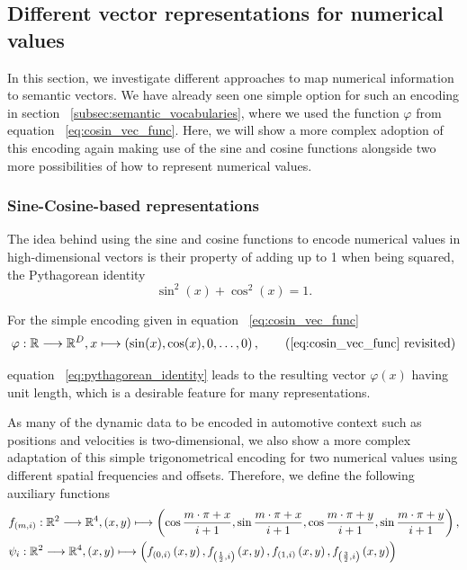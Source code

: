 \subsection{Different vector representations for numerical values}%
\label{subsec:different_vector_representations_for_numerical_values}

In this section, we investigate different approaches to map numerical information to semantic vectors.
We have already seen one simple option for such an encoding in section ~\ref{subsec:semantic_vocabularies}, where we used the function $\varphi$ from equation ~\ref{eq:cosin_vec_func}.
Here, we will show a more complex adoption of this encoding again making use of the sine and cosine functions alongside two more possibilities of how to represent numerical values.

\subsubsection{Sine-Cosine-based representations}%
\label{ssubsec:sine_cosine_based_representations}

The idea behind using the sine and cosine functions to encode numerical values in high-dimensional vectors is their property of adding up to \num{1} when being squared, the Pythagorean identity
\begin{equation}
\label{eq:pythagorean_identity}
\sin^{2}(x) + \cos^{2}(x) = 1.
\end{equation}

For the simple encoding given in equation ~\ref{eq:cosin_vec_func} 
\begin{equation}
\abb{\varphi}{\mathbb{R}}{\mathbb{R}^{D}}{x}{\left(\sin(x), \cos(x), 0, \ldots, 0\right)},
\tag{\ref{eq:cosin_vec_func} revisited}
\end{equation}

equation ~\ref{eq:pythagorean_identity} leads to the resulting vector $\varphi(x)$ having unit length, which is a desirable feature for many representations.

As many of the dynamic data to be encoded in automotive context such as positions and velocities is two-dimensional, we also show a more complex adaptation of this simple trigonometrical encoding for two numerical values using different spatial frequencies and offsets.
Therefore, we define the following auxiliary functions
\begin{align}
    &f_{\left(m,i\right)}: \mathbb{R}^2 \longrightarrow \mathbb{R}^4, \left(x,y\right) \longmapsto \left(\cos\frac{m\cdot \pi + x}{i + 1}, \sin\frac{m\cdot \pi + x}{i + 1}, \cos\frac{m\cdot \pi + y}{i + 1}, \sin\frac{m\cdot \pi + y}{i + 1}\right), \label{eq:cos_aux_1} \\
    &\psi_i: \mathbb{R}^2 \longrightarrow \mathbb{R}^4, \left(x,y\right) \longmapsto \left(f_{\left(0,i\right)}\left(x,y\right), f_{\left(\frac{1}{2},i\right)}\left(x,y\right), f_{\left(1,i\right)}\left(x,y\right), f_{\left(\frac{3}{2},i\right)}\left(x,y\right)\right) \label{eq:cos_aux_2}
\end{align}

